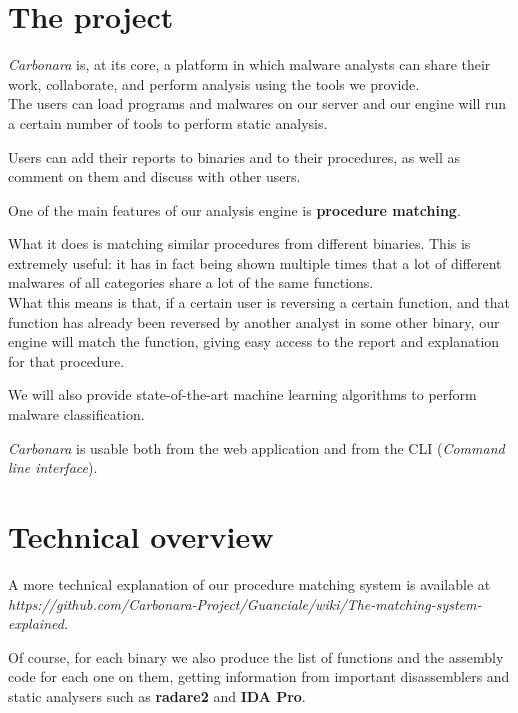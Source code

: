 \documentclass{article}
\begin{document}
\section{The project}

\textit{Carbonara} is, at its core, a platform in which malware analysts can share their work, collaborate, and perform analysis using the tools we provide.\\
The users can load programs and malwares on our server and our engine will run a certain number of tools to perform static analysis.

Users can add their reports to binaries and to their procedures, as well as comment on them and discuss with other users.\par 

One of the main features of our analysis engine is \textbf{procedure matching}.

What it does is matching similar procedures from different binaries. 
This is extremely useful: it has in fact being shown multiple times that a lot of different malwares of all categories share a lot of the same functions.\\

What this means is that, if a certain user is reversing a certain function, and that function has already been reversed by another analyst in some other binary, our engine will match the function, giving easy access to the report and explanation for that procedure. \par

We will also provide state-of-the-art machine learning algorithms to perform malware classification. \par 

\textit{Carbonara} is usable both from the web application and from the CLI (\textit{Command line interface}).



\section{Technical overview}

A more technical explanation of our procedure matching system is available at \textit{https://github.com/Carbonara-Project/Guanciale/wiki/The-matching-system-explained}.

Of course, for each binary we also produce the list of functions and the assembly code for each one on them, getting information from important disassemblers and static analysers such as \textbf{radare2} and \textbf{IDA Pro}.
\end{document}
